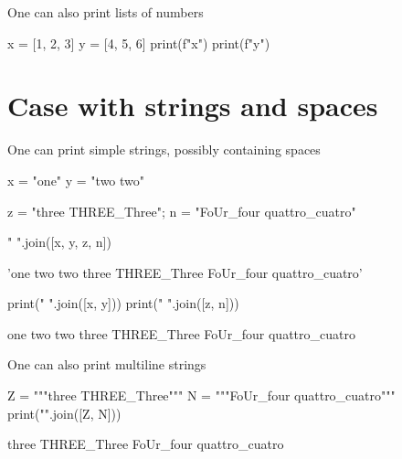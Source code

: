 \documentclass[oneside]{book}
\begin{document}
\begin{mdcell}
One can also print lists of numbers
\end{mdcell}

\begin{pycell}
x = [1, 2, 3]
y = [4, 5, 6]
print(f"{x}")
print(f"{y}")
\end{pycell}
\begin{pyexpectedoutput}
[1, 2, 3]
[4, 5, 6]
\end{pyexpectedoutput}

\chapter{Case with strings and spaces}

\begin{mdcell}
One can print simple strings, possibly containing spaces
\end{mdcell}

\begin{pycell}
x = "one"
y = "two two"
\end{pycell}

\begin{pycell}
z = "three THREE_Three"; n = "FoUr_four quattro_cuatro"
\end{pycell}

\begin{pycell}
" ".join([x, y, z, n])
\end{pycell}
\begin{pyexpectedoutput}
'one two two three THREE_Three FoUr_four quattro_cuatro'
\end{pyexpectedoutput}

\begin{pycell}
print(" ".join([x, y]))
print(" ".join([z, n]))
\end{pycell}
\begin{pyexpectedoutput}
one two two
three THREE_Three FoUr_four quattro_cuatro
\end{pyexpectedoutput}

\begin{mdcell}
One can also print multiline strings
\end{mdcell}

\begin{pycell}
Z = """three
THREE_Three"""
N = """FoUr_four
quattro_cuatro"""
print("\n".join([Z, N]))
\end{pycell}
\begin{pyexpectedoutput}
three
THREE_Three
FoUr_four
quattro_cuatro
\end{pyexpectedoutput}
\end{document}
